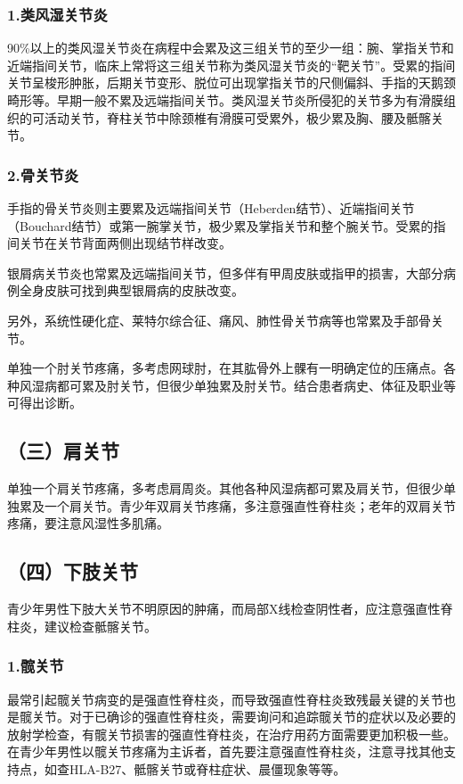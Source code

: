 \subsubsection{1.类风湿关节炎}

90\%以上的类风湿关节炎在病程中会累及这三组关节的至少一组：腕、掌指关节和近端指间关节，临床上常将这三组关节称为类风湿关节炎的“靶关节”。受累的指间关节呈梭形肿胀，后期关节变形、脱位可出现掌指关节的尺侧偏斜、手指的天鹅颈畸形等。早期一般不累及远端指间关节。类风湿关节炎所侵犯的关节多为有滑膜组织的可活动关节，脊柱关节中除颈椎有滑膜可受累外，极少累及胸、腰及骶髂关节。

\subsubsection{2.骨关节炎}

手指的骨关节炎则主要累及远端指间关节（Heberden结节）、近端指间关节（Bouchard结节）或第一腕掌关节，极少累及掌指关节和整个腕关节。受累的指间关节在关节背面两侧出现结节样改变。

银屑病关节炎也常累及远端指间关节，但多伴有甲周皮肤或指甲的损害，大部分病例全身皮肤可找到典型银屑病的皮肤改变。

另外，系统性硬化症、莱特尔综合征、痛风、肺性骨关节病等也常累及手部骨关节。

单独一个肘关节疼痛，多考虑网球肘，在其肱骨外上髁有一明确定位的压痛点。各种风湿病都可累及肘关节，但很少单独累及肘关节。结合患者病史、体征及职业等可得出诊断。

\subsection{（三）肩关节}

单独一个肩关节疼痛，多考虑肩周炎。其他各种风湿病都可累及肩关节，但很少单独累及一个肩关节。青少年双肩关节疼痛，多注意强直性脊柱炎；老年的双肩关节疼痛，要注意风湿性多肌痛。

\subsection{（四）下肢关节}

青少年男性下肢大关节不明原因的肿痛，而局部X线检查阴性者，应注意强直性脊柱炎，建议检查骶髂关节。

\subsubsection{1.髋关节}

最常引起髋关节病变的是强直性脊柱炎，而导致强直性脊柱炎致残最关键的关节也是髋关节。对于已确诊的强直性脊柱炎，需要询问和追踪髋关节的症状以及必要的放射学检查，有髋关节损害的强直性脊柱炎，在治疗用药方面需要更加积极一些。在青少年男性以髋关节疼痛为主诉者，首先要注意强直性脊柱炎，注意寻找其他支持点，如查HLA-B27、骶髂关节或脊柱症状、晨僵现象等等。

